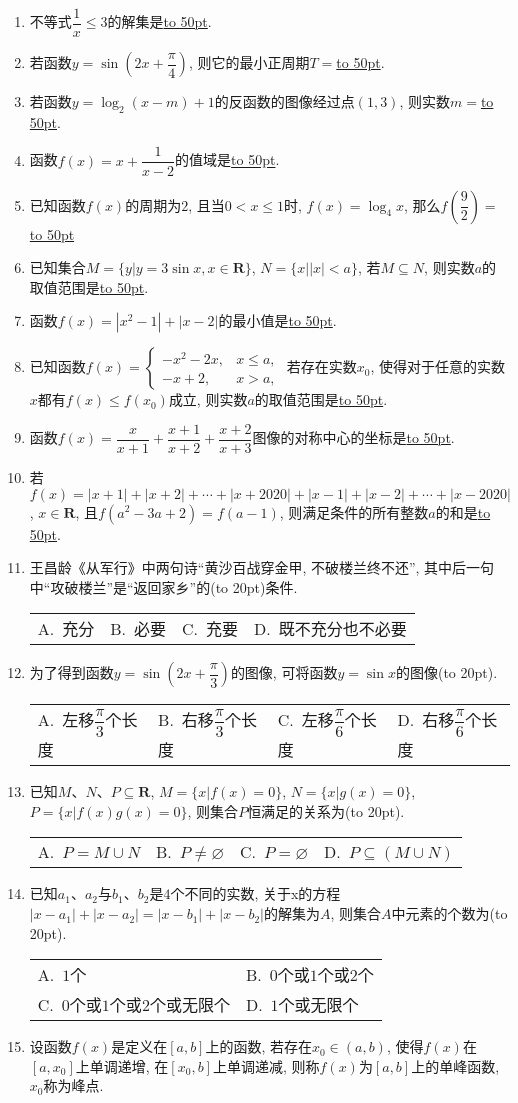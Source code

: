 \documentclass[10pt,a4paper]{article}
\newcommand{\blank}[1]{\underline{\hbox to #1pt{}}}
\newcommand{\bracket}[1]{(\hbox to #1pt{})}
\newcommand{\twoch}[4]{\par\begin{tabular}{p{.46\textwidth}p{.46\textwidth}}
A.~#1& B.~#2\\
C.~#3& D.~#4
\end{tabular}}
\newcommand{\fourch}[4]{\par\begin{tabular}{p{.23\textwidth}p{.23\textwidth}p{.23\textwidth}p{.23\textwidth}}
A.~#1 &B.~#2& C.~#3& D.~#4
\end{tabular}}
\begin{document}
\begin{enumerate}[1.]
\item 不等式$\dfrac 1x\le 3$的解集是\blank{50}.
\item 若函数$y=\sin (2x+\dfrac{\pi }4)$, 则它的最小正周期$T=$\blank{50}.
\item 若函数$y=\log_2(x-m)+1$的反函数的图像经过点$(1,3)$, 则实数$m=$\blank{50}.
\item 函数$f(x)=x+\dfrac 1{x-2}$的值域是\blank{50}.
\item 已知函数$f(x)$的周期为$2$, 且当$0<x\le 1$时, $f(x)=\log_4x$, 那么$f(\dfrac 92)=$\blank{50}
\item 已知集合$M=\{y|y=3\sin x,x\in \mathbf{R}\}$, $N=\{x||x|<a\}$, 若$M\subseteq N$, 则实数$a$的取值范围是\blank{50}.
\item 函数$f(x)=|x^2-1|+|x-2|$的最小值是\blank{50}.
\item 已知函数$f(x)=\begin{cases}  -x^2-2x, & x\le a,  \\-x+2, &x>a,  \end{cases}$ 若存在实数$x_0$, 使得对于任意的实数$x$都有$f(x)\le f(x_0)$成立, 则实数$a$的取值范围是\blank{50}.
\item 函数$f(x)=\dfrac x{x+1}+\dfrac{x+1}{x+2}+\dfrac{x+2}{x+3}$图像的对称中心的坐标是\blank{50}.
\item 若$f(x)=|x+1|+|x+2|+\cdots +|x+2020|+|x-1|+|x-2|+\cdots +|x-2020|$, $x\in \mathbf{R}$, 且$f(a^2-3a+2)=f(a-1)$, 则满足条件的所有整数$a$的和是\blank{50}.
\item 王昌龄《从军行》中两句诗``黄沙百战穿金甲, 不破楼兰终不还'', 其中后一句中``攻破楼兰''是``返回家乡''的\bracket{20}条件.
\fourch{充分}{必要}{充要}{既不充分也不必要}
\item 为了得到函数$y=\sin (2x+\dfrac{\pi}3)$的图像, 可将函数$y=\sin x$的图像\bracket{20}.
\fourch{左移$\dfrac{\pi}3$个长度}{右移$\dfrac{\pi}3$个长度}{左移$\dfrac{\pi}6$个长度}{右移$\dfrac{\pi}6$个长度}
\item 已知$M$、$N$、$P\subseteq \mathbf{R}$, $M=\{x|f(x)=0\}$, $N=\{x|g(x)=0\}$, $P=\{x|f(x)g(x)=0\}$, 则集合$P$恒满足的关系为\bracket{20}.
\fourch{$P=M\cup N$}{$P\ne \varnothing$}{$P=\varnothing$}{$P\subseteq (M\cup N)$}
\item 已知$a_1$、$a_2$与$b_1$、$b_2$是$4$个不同的实数, 关于x的方程$|x-a_1|+|x-a_2|=|x-b_1|+|x-b_2|$的解集为$A$, 则集合$A$中元素的个数为\bracket{20}.
\twoch{$1$个}{$0$个或$1$个或$2$个}{$0$个或$1$个或$2$个或无限个}{$1$个或无限个}
\item 设函数$f(x)$是定义在$[a,b]$上的函数, 若存在$x_0\in (a,b)$, 使得$f(x)$在$[a,x_0]$上单调递增, 在$[x_0,b]$上单调递减, 则称$f(x)$为$[a,b]$上的单峰函数, $x_0$称为峰点.\\

\end{enumerate}
\end{document}
